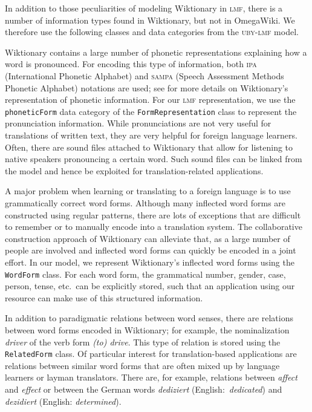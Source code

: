 \documentclass[output=paper]{LSP/langsci}
\begin{document}
In addition to those peculiarities of modeling Wiktionary in \textsc{lmf}, there is a number of information types found in Wiktionary, but not in OmegaWiki. We therefore use the following classes and data categories from the \textsc{uby-lmf} model.

\begin{description}\sloppy
\item[Phonetic Representation.]
Wiktionary contains a large number of phonetic representations explaining how a word is pronounced. For encoding this type of information, both \textsc{ipa} (International Phonetic Alphabet) and \textsc{sampa} (Speech Assessment Methods Phonetic Alphabet) notations are used; see \citet{Schlippe10} for more details on Wiktionary's representation of phonetic information. For our \textsc{lmf} representation, we use the \texttt{phoneticForm} data category of the \texttt{FormRepresentation} class to represent the pronunciation information. While pronunciations are not very useful for translations of written text, they are very helpful for foreign language learners. Often, there are sound files attached to Wiktionary that allow for listening to native speakers pronouncing a certain word. Such sound files can be linked from the model and hence be exploited for translation-related applications.

\item[Inflected Word Forms.]
A major problem when learning or translating to a foreign language is to use grammatically correct word forms. Although many inflected word forms are constructed using regular patterns, there are lots of exceptions that are difficult to remember or to manually encode into a translation system. The collaborative construction approach of Wiktionary can alleviate that, as a large number of people are involved and inflected word forms can quickly be encoded in a joint effort. In our model, we represent Wiktionary's inflected word forms using the \texttt{WordForm} class. For each word form, the grammatical number, gender, case, person, tense, etc.\ can be explicitly stored, such that an application using our resource can make use of this structured information.

\item[Related Words.]
In addition to paradigmatic relations between word senses, there are relations between word forms encoded in Wiktionary; for example, the nominalization \textit{driver} of the verb form \textit{(to) drive}. This type of relation is stored using the \texttt{RelatedForm} class. Of particular interest for translation-based applications are relations between similar word forms that are often mixed up by language learners or layman translators. There are, for example, relations between \textit{affect} and \textit{effect} or between the German words \textit{dediziert} (English:\ \textit{dedicated}) and \textit{dezidiert} (English: \textit{determined}).
\end{description}
\end{document}
